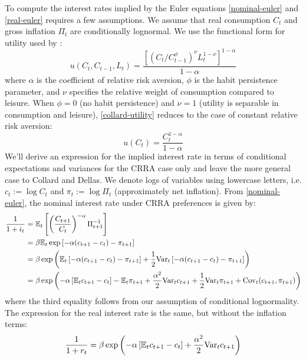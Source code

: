 To compute the interest rates implied by the Euler equations \eqref{nominal-euler} and \eqref{real-euler} requires a few assumptions. We assume that real consumption $C_t$ and gross inflation $\Pi_t$ are conditionally lognormal. We use the functional form for utility used by \cite{collard11}:
\begin{equation}
\label{collard-utility}
u(C_t, C_{t-1}, L_t) = \frac{[(C_t/C_{t-1}^\phi)^\nu L_t^{1-\nu}]^{1-\alpha}}{1-\alpha}
\end{equation}
where $\alpha$ is the coefficient of relative risk aversion, $\phi$ is the habit persistence parameter, and $\nu$ specifies the relative weight of consumption compared to leisure. When $\phi = 0$ (no habit persistence) and $\nu = 1$ (utility is separable in consumption and leisure), \eqref{collard-utility} reduces to the case of constant relative risk aversion:
\begin{equation}
\label{crra-utility}
u(C_t) = \frac{C_t^{1-\alpha}}{1-\alpha}
\end{equation}
We'll derive an expression for the implied interest rate in terms of conditional expectations and variances for the CRRA case only and leave the more general case to Collard and Dellas. We denote logs of variables using lowercase letters, i.e. $c_t := \log C_t$ and $\pi_t := \log \Pi_t$ (approximately net inflation). From \eqref{nominal-euler}, the nominal interest rate under CRRA preferences is given by:
\begin{align}
\label{nominal-euler-crra}
\frac{1}{1 + i_t} &= \mathbb{E}_t \left[  \left( \frac{C_{t+1}}{C_t} \right)^{-\alpha} \Pi_{t+1}^{-1}  \right] \\
  &= \beta \mathbb{E}_t \exp \left[  -\alpha(c_{t+1} - c_t) - \pi_{t+1}  \right] \nonumber \\
  &= \beta \exp \left(  \mathbb{E}_t \left[  -\alpha(c_{t+1} - c_t) - \pi_{t+1}  \right] + \frac{1}{2} \mathrm{Var}_t \left[  -\alpha(c_{t+1} - c_t) - \pi_{t+1}  \right]  \right) \nonumber \\
  &= \beta \exp \left(  -\alpha \left[  \mathbb{E}_t c_{t+1} - c_t  \right] - \mathbb{E}_t \pi_{t+1}  + \frac{\alpha^2}{2} \mathrm{Var}_t c_{t+1} + \frac{1}{2} \mathrm{Var}_t \pi_{t+1} + \mathrm{Cov}_t(c_{t+1}, \pi_{t+1})  \right) \nonumber
\end{align}
where the third equality follows from our assumption of conditional lognormality. The expression for the real interest rate is the same, but without the inflation terms: $$\frac{1}{1 + r_t} = \beta \exp \left(  -\alpha \left[  \mathbb{E}_t c_{t+1} - c_t  \right] + \frac{\alpha^2}{2} \mathrm{Var}_t c_{t+1}  \right)$$

